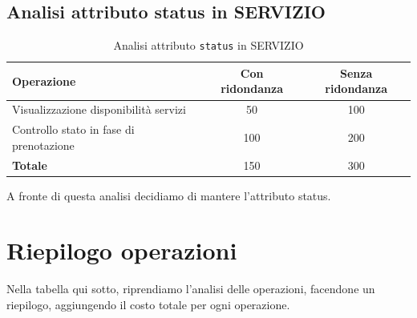 \documentclass[a4paper,12pt]{report}
\begin{document}
\subsection{Analisi attributo status in SERVIZIO}

\begin{table}[H]
	\centering
	\begin{tabular}{|l|c|c|}
		\hline
		\textbf{Operazione}                     & \textbf{Con ridondanza} & \textbf{Senza ridondanza} \\
		\hline
		Visualizzazione disponibilità servizi   & 50                      & 100                       \\
		Controllo stato in fase di prenotazione & 100                     & 200                       \\
		\hline
		\textbf{Totale}                         & 150                     & 300                       \\
		\hline
	\end{tabular}
	\caption{Analisi attributo \texttt{status} in SERVIZIO}
\end{table}

A fronte di questa analisi decidiamo di mantere l'attributo status.

\newpage
\section{Riepilogo operazioni}
Nella tabella qui sotto, riprendiamo l'analisi delle operazioni, facendone un riepilogo, aggiungendo
il costo totale per ogni operazione.
\end{document}
